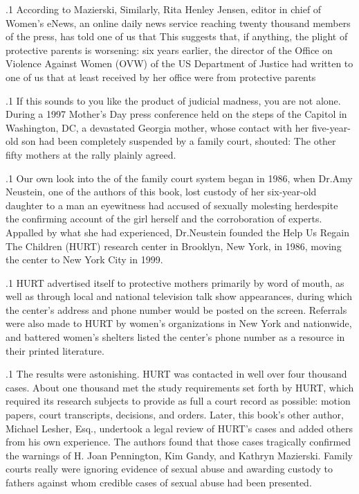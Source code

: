 \documentclass[11pt, twoside]{article}
\begin{document}
{\p.1{%
According to Mazierski,  Similarly, Rita Henley Jensen, editor in chief of Women’s eNews,
an online daily news service reaching twenty thousand members of the
press, has told one of us that  This
suggests that, if anything, the plight of protective parents is worsening:
six years earlier, the director of the Office on Violence Against Women
(OVW) of the US Department of Justice had written to one of us that
at least  received by her office were from protective
parents 
}%

\p.1{%
If this sounds to you like the product of judicial madness, you are not
alone. During a 1997 Mother’s Day press conference held on the steps
of the Capitol in Washington, DC, a devastated Georgia mother, whose
contact with her five-year-old son had been completely suspended by a
family court, shouted:  The other fifty mothers at the rally plainly agreed.
}%

\p.1{%
Our own look into the  of the family court
system began in 1986, when Dr.\@ Amy Neustein, one of the authors of this book,
lost custody of her six-year-old daughter to a man an eyewitness had
accused of sexually molesting her\mdash{}despite the confirming account of
the girl herself and the corroboration of experts. Appalled by what she
had experienced, Dr.\@ Neustein founded the Help Us Regain The Children (HURT) research center in Brooklyn, New York, in 1986, moving the center
to New York City in 1999.
}%

\p.1{%
HURT advertised itself to protective mothers primarily by word of
mouth, as well as through local and national television talk show appearances, during which the center’s address and phone number would
be posted on the screen. Referrals were also made to HURT by women’s
organizations in New York and nationwide, and battered women’s shelters listed the center’s phone number as a resource in their printed
literature.
}%

\p.1{%
The results were astonishing. HURT was contacted in well over four
thousand cases. About one thousand met the study requirements set
forth by HURT, which required its research subjects to provide as full a
court record as possible: motion papers, court transcripts, decisions, and
orders. Later, this book’s other author, Michael Lesher, Esq., undertook a
legal review of HURT’s cases and added others from his own experience.
The authors found that those cases tragically confirmed the warnings of
H. Joan Pennington, Kim Gandy, and Kathryn Mazierski. Family
courts really were ignoring
evidence of sexual abuse and awarding custody to fathers against whom
credible cases of sexual abuse had been presented.
}%

}
\end{document}
